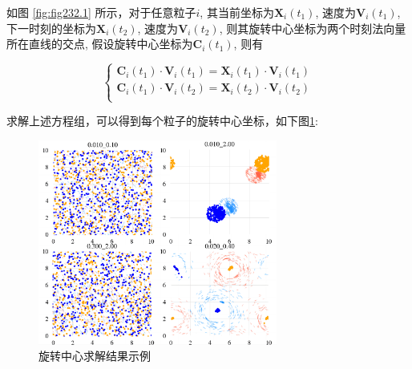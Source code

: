 \documentclass{article}
\begin{document}
如图 \ref{fig:fig232.1} 所示，对于任意粒子$i$, 其当前坐标为$\mathbf{X}_i\left( t_1 \right)$, 速度为$\mathbf{V}_i\left( t_1 \right)$, 下一时刻的坐标为$\mathbf{X}_i\left( t_2 \right)$, 速度为$\mathbf{V}_i\left( t_2 \right)$, 则其旋转中心坐标为两个时刻法向量所在直线的交点, 假设旋转中心坐标为$\mathbf{C}_i\left( t_1 \right)$, 则有

\vspace{-0.5cm}

$$
\begin{cases}
	\mathbf{C}_i\left( t_1 \right) \cdot \mathbf{V}_i\left( t_1 \right) =\mathbf{X}_i\left( t_1 \right) \cdot \mathbf{V}_i\left( t_1 \right) \\
	\mathbf{C}_i\left( t_1 \right) \cdot \mathbf{V}_i\left( t_2 \right) =\mathbf{X}_i\left( t_2 \right) \cdot \mathbf{V}_i\left( t_2 \right) \\
\end{cases}
$$



求解上述方程组，可以得到每个粒子的旋转中心坐标，如下图\ref{fig:fig232.2}:%

\begin{figure}[H]
	\centering
	\includegraphics[width=0.7\textwidth]{./figs/centorsBigGraph_sub.png}
	\vspace{-0.2cm}
	\caption{旋转中心求解结果示例}
	\label{fig:fig232.2}
\end{figure}
\end{document}
